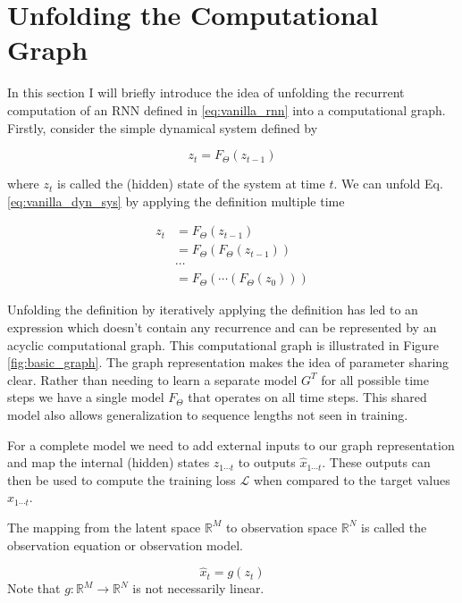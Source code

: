 \section{Unfolding the Computational Graph}
In this section I will briefly introduce the idea of unfolding the recurrent computation of an RNN defined in \ref{eq:vanilla_rnn} into a computational graph. 
Firstly, consider the simple dynamical system defined by 

\begin{equation}
    z_{t} = F_{\Theta}(z_{t-1})
    \label{eq:vanilla_dyn_sys}
\end{equation}

where $z_{t}$ is called the (hidden) state of the system at time $t$. We can unfold Eq. \ref{eq:vanilla_dyn_sys} by applying the definition multiple time 

\begin{align}
    z_{t} &= F_{\Theta}(z_{t-1}) \\
          &= F_{\Theta}(F_{\Theta}(z_{t-1})) \\
          & \cdots \nonumber\\
          &= F_{\Theta}(\cdots (F_{\Theta}(z_{0})))
\end{align}

Unfolding the definition by iteratively applying the definition has led to an expression which doesn't contain any recurrence and can be represented by an acyclic 
computational graph. This computational graph is illustrated in Figure \ref{fig:basic_graph}. 
The graph representation makes the idea of parameter sharing clear. Rather than needing to learn a separate model $G^{T}$ for all possible time steps
we have a single model $F_{\Theta}$ that operates on all time steps. This shared model also allows generalization to sequence lengths not seen in training.



For a complete model we need to add external inputs to our graph representation and map the internal (hidden) states $z_{1 \cdots t}$ to outputs $\hat{x}_{1 \cdots t}$.
These outputs can then be used to compute the training loss $\mathcal{L}$ when compared to the target values $x_{1 \cdots t}$. 

The mapping from the latent space $\mathbb{R}^M$ to observation space $\mathbb{R}^N$ is called the observation equation or observation model.  

\begin{equation}
    \hat{x}_t = g(z_t)
\end{equation}
Note that $g: \mathbb{R}^M \rightarrow \mathbb{R}^N$ is not necessarily linear.

